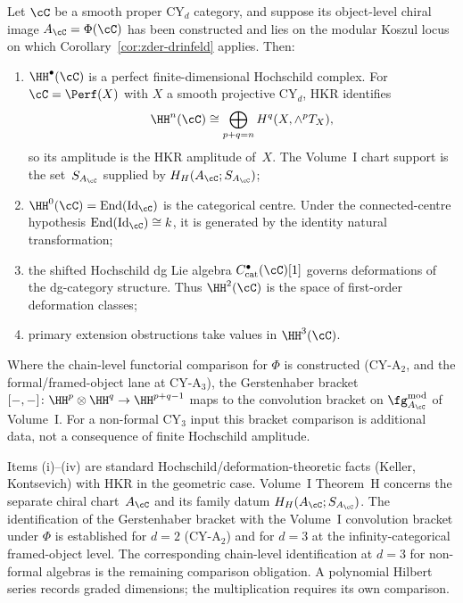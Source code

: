 \begin{theorem}
\label{thm:categorical-thm-h}
Let $\cC$ be a smooth proper CY$_d$ category, and suppose its
object-level chiral image $A_\cC=\Phi(\cC)$ has been constructed and
lies on the modular Koszul locus on which Corollary~\ref{cor:zder-drinfeld}
applies. Then:
\begin{enumerate}[label=(\roman*)]
 \item $\HH^\bullet(\cC)$ is a perfect finite-dimensional Hochschild
 complex. For $\cC=\Perf(X)$ with $X$ a smooth projective CY$_d$, HKR
 identifies
 \[
 \HH^n(\cC)\cong \bigoplus_{p+q=n} H^q(X,\wedge^pT_X),
 \]
 so its amplitude is the HKR amplitude of~\(X\).  The Volume~I chart
 support is the set~$S_{A_\cC}$ supplied by $H_H(A_\cC;S_{A_\cC})$;
 \item $\HH^0(\cC)=\operatorname{End}(\operatorname{Id}_{\cC})$ is
 the categorical centre. Under the connected-centre hypothesis
 $\operatorname{End}(\operatorname{Id}_{\cC})\cong k$, it is generated
 by the identity natural transformation;
 \item the shifted Hochschild dg Lie algebra
 $C^\bullet_{\mathrm{cat}}(\cC)[1]$ governs deformations of the
 dg-category structure. Thus $\HH^2(\cC)$ is the space of first-order
 deformation classes;
 \item primary extension obstructions take values in $\HH^3(\cC)$.
\end{enumerate}
Where the chain-level functorial comparison for $\Phi$ is constructed
\textup{(}CY-A$_2$, and the formal/framed-object lane at CY-A$_3$\textup{)},
the Gerstenhaber bracket $[-,-]\colon \HH^p\otimes\HH^q\to
\HH^{p+q-1}$ maps to the convolution bracket on
$\fg^{\mathrm{mod}}_{A_\cC}$ of Volume~I. For a non-formal CY$_3$
input this bracket comparison is additional data, not a consequence
of finite Hochschild amplitude.
\end{theorem}

\begin{remark}
\label{rem:categorical-thm-h-scope}
Items (i)--(iv) are standard Hochschild/deformation-theoretic facts
(Keller, Kontsevich) with HKR in the geometric case.  Volume~I
Theorem~H concerns the separate chiral chart~$A_\cC$ and its family
datum $H_H(A_\cC;S_{A_\cC})$. The identification of the
Gerstenhaber bracket with the Volume~I convolution bracket under
$\Phi$ is established for $d = 2$ (CY-A$_2$) and for $d = 3$ at the
infinity-categorical framed-object level. The corresponding
chain-level identification at $d = 3$ for non-formal algebras is the
remaining comparison obligation. A polynomial Hilbert series records
graded dimensions; the multiplication requires its own comparison.
\end{remark}


